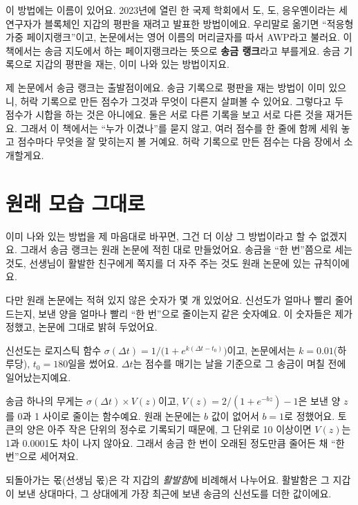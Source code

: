 이 방법에는 이름이 있어요.
2023년에 열린 한 국제 학회에서 도, 도, 응우옌이라는 세 연구자가 블록체인 지갑의 평판을 재려고 발표한 방법이에요.
우리말로 옮기면 “적응형 가중 페이지랭크”이고, 논문에서는 영어 이름의 머리글자를 따서 AWP라고 불러요.
이 책에서는 송금 지도에서 하는 페이지랭크라는 뜻으로 \textbf{송금 랭크}라고 부를게요.
송금 기록으로 지갑의 평판을 재는, 이미 나와 있는 방법이지요.

제 논문에서 송금 랭크는 출발점이에요.
송금 기록으로 평판을 재는 방법이 이미 있으니, 허락 기록으로 만든 점수가 그것과 무엇이 다른지 살펴볼 수 있어요.
그렇다고 두 점수가 시합을 하는 것은 아니에요.
둘은 서로 다른 기록을 보고 서로 다른 것을 재거든요.
그래서 이 책에서는 “누가 이겼나”를 묻지 않고, 여러 점수를 한 줄에 함께 세워 놓고 점수마다 무엇을 잘 맞히는지 볼 거예요.
허락 기록으로 만든 점수는 다음 장에서 소개할게요.

\section{원래 모습 그대로}

이미 나와 있는 방법을 제 마음대로 바꾸면, 그건 더 이상 그 방법이라고 할 수 없겠지요.
그래서 송금 랭크는 원래 논문에 적힌 대로 만들었어요.
송금을 “한 번”쯤으로 세는 것도, 선생님이 활발한 친구에게 쪽지를 더 자주 주는 것도 원래 논문에 있는 규칙이에요.

다만 원래 논문에는 적혀 있지 않은 숫자가 몇 개 있었어요.
신선도가 얼마나 빨리 줄어드는지, 보낸 양을 얼마나 빨리 “한 번”으로 줄이는지 같은 숫자예요.
이 숫자들은 제가 정했고, 논문에 그대로 밝혀 두었어요.

\begin{deeper}[송금 랭크의 식]
신선도는 로지스틱 함수 $\sigma(\Delta t) = 1/\bigl(1+e^{k(\Delta t - t_0)}\bigr)$이고,
논문에서는 $k=0.01$(하루당), $t_0=180$일을 썼어요.
$\Delta t$는 점수를 매기는 날을 기준으로 그 송금이 며칠 전에 일어났는지예요.

송금 하나의 무게는 $\sigma(\Delta t)\times V(z)$이고,
$V(z) = 2/(1+e^{-bz}) - 1$은 보낸 양 $z$를 0과 1 사이로 줄이는 함수예요.
원래 논문에는 $b$ 값이 없어서 $b=1$로 정했어요.
토큰의 양은 아주 작은 단위의 정수로 기록되기 때문에, 그 단위로 10 이상이면 $V(z)$는 1과 0.0001도 차이 나지 않아요.
그래서 송금 한 번이 오래된 정도만큼 줄어든 채 “한 번”으로 세어져요.

되돌아가는 몫(선생님 몫)은 각 지갑의 \emph{활발함}에 비례해서 나누어요.
활발함은 그 지갑이 보낸 상대마다, 그 상대에게 가장 최근에 보낸 송금의 신선도를 더한 값이에요.
\end{deeper}

